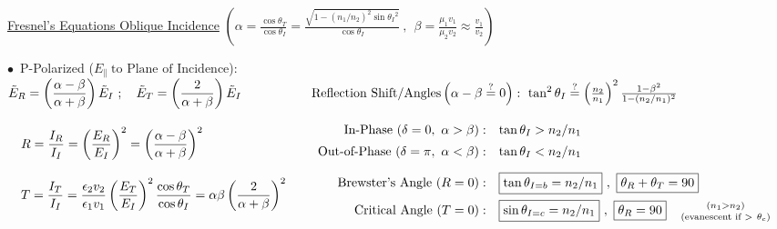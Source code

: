 \documentclass[12pt]{article}
\begin{document}
\vspace{20pt} \noindent
\underline{Fresnel's Equations Oblique Incidence}
\indent \(\left( \alpha =\displaystyle \frac{\cos \theta_T}{\cos \theta_I} 
	= \frac{\scriptstyle \sqrt{1 - (n_1/n_2)^2\sin{\theta_I}^2} }{\cos \theta_I} \ , \ \ 
	\beta = \frac{\mu_1 v_1}{\mu_2 v_2} \approx \frac{v_1}{v_2} \right)\)

\vspace{15pt}\noindent
\(\bullet\)\ P-Polarized (\(E_\parallel\ \text{to Plane of Incidence}\)):\\[10pt]
\(\begin{aligned}[t]
	&\tilde E_R = \left( \frac{\alpha-\beta}{\alpha+\beta} \right) \tilde E_I\ ;\ \ \ 
		\tilde E_T = \left( \frac{2}{\alpha+\beta} \right) \tilde E_I\\[10pt]	
	&\ \ \ R = \frac{I_R}{I_I} = \left( \frac{E_R}{E_I} \right)^2 
		= \left( \frac{\alpha-\beta}{\alpha+\beta} \right)^2 \\[10pt]
	&\ \ \ T = \frac{I_T}{I_I} = \frac{\epsilon_2 v_2}{\epsilon_1 v_1} 
		\left( \frac{E_T}{E_I} \right)^2 \frac{\cos \theta_T}{\cos \theta_I} 
		= \alpha \beta \left( \frac{2}{\alpha+\beta} \right)^2
\end{aligned}
\hspace{20pt}
\begin{aligned}[t]
	&\text{Reflection Shift/Angles} \left( \alpha - \beta \stackrel{?}{=} 0 \right): \ \tan^2 \theta_I 
		\stackrel{?}{=} \left( \tfrac{n_2}{n_1} \right)^2 \tfrac{1-\beta^2}{1 - (n_2/n_1)^2}\\[10pt]
	&\begin{array}{r l}
		\text{In-Phase}\ (\delta = 0,\ \alpha > \beta):			& \tan{\theta_I} > n_2/n_1\\[5pt]
		\text{Out-of-Phase}\ (\delta = \pi,\ \alpha < \beta):	& \tan{\theta_I} < n_2/n_1\\[10pt]
		\text{Brewster's Angle}\ (R = 0):						& \boxed{ \tan{\theta_{I=b}} = n_2/n_1 }\ ,\ 
			\boxed{ \theta_R + \theta_T = 90 }\\[5pt]
		\text{Critical Angle}\ (T=0):							& \boxed{ \sin{\theta_{I=c}} = n_2/n_1}\ , \ 
			\boxed{ \theta_R = 90 } \hspace{.4cm} \begin{gathered}
				{\scriptstyle(n_1>n_2)}\\[-3pt]
				{\scriptstyle(\text{evanescent if } >\ \theta_c)}
			\end{gathered}
	\end{array}
\end{aligned}\)
\end{document}
